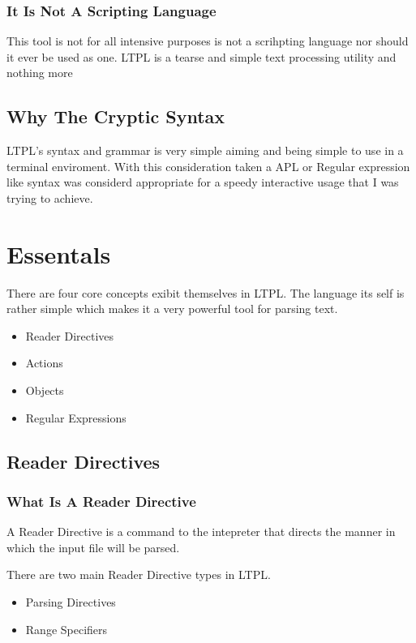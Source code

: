 \documentclass[11pt]{article}
\begin{document}
\subsubsection{It Is Not A Scripting Language}
\label{sec:org455a8d3}
This tool is not for all intensive purposes is not a scrihpting language nor should it ever be used as one.
LTPL is a tearse and simple text processing utility and nothing more
\subsection{Why The Cryptic Syntax}
\label{sec:orgd8d66f5}
LTPL's syntax and grammar is very simple aiming and being simple to use in a terminal enviroment.
With this consideration taken a APL or Regular expression like syntax was considerd appropriate for a speedy interactive usage that I was trying to achieve.
\section{Essentals}
\label{sec:org2638a8d}
There are four core concepts exibit themselves in LTPL.
The language its self is rather simple which makes it a very powerful tool for parsing text.

\begin{itemize}
\item Reader Directives
\item Actions
\item Objects
\item Regular Expressions
\end{itemize}

\subsection{Reader Directives}
\label{sec:org9eda990}
\subsubsection{What Is A Reader Directive}
\label{sec:org456c31e}
A Reader Directive is a command to the intepreter that directs the manner in which the input file will be parsed.

There are two main Reader Directive types in LTPL.
\begin{itemize}
\item Parsing Directives
\item Range Specifiers
\end{itemize}
\end{document}
